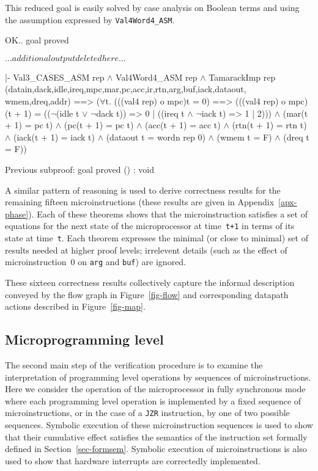 This reduced goal is easily solved by case analysis on Boolean terms
and using the assumption expressed by \verb"Val4Word4_ASM".

\newpage %

\begintt
OK..
goal proved

\( \ldots additional output deleted here \ldots \)

|- Val3_CASES_ASM rep \(\wedge\)
   Val4Word4_ASM rep \(\wedge\)
   TamarackImp 
   rep
   (datain,dack,idle,ireq,mpc,mar,pc,acc,ir,rtn,arg,buf,iack,dataout,
    wmem,dreq,addr) ==>
   (\(\forall\)t.
     (((val4 rep) o mpc)t = 0) ==>
     (((val4 rep) o mpc)(t + 1) =
      ((\(\neg\)(idle t \(\vee\) \(\neg\)dack t)) => 0 | ((ireq t \(\wedge\) \(\neg\)iack t) => 1 | 2))) \(\wedge\)
     (mar(t + 1) = pc t) \(\wedge\)
     (pc(t + 1) = pc t) \(\wedge\)
     (acc(t + 1) = acc t) \(\wedge\)
     (rtn(t + 1) = rtn t) \(\wedge\)
     (iack(t + 1) = iack t) \(\wedge\)
     (dataout t = wordn rep 0) \(\wedge\)
     (wmem t = F) \(\wedge\)
     (dreq t = F))

Previous subproof:
goal proved
() : void
\endtt

A similar pattern of reasoning is used to derive correctness results for the
remaining fifteen microinstructions
(these results are given in Appendix~\ref{apx-phase}).
Each of these theorems shows that the microinstruction
satisfies a set of equations for the next state of the microprocessor
at time~\verb"t+1" in terms of its state at time~\verb"t".
Each theorem expresses the minimal (or close to minimal) set of results
needed at higher proof levels;
irrelevent details (such as the effect of
microinstruction~0 on \verb"arg" and \verb"buf") are ignored.

These sixteen correctness results collectively
capture the informal description conveyed by
the flow graph in Figure~\ref{fig-flow} and corresponding
datapath actions described in Figure~\ref{fig-map}.

\subsection{Microprogramming level}
\label{sec-verfmicro}

The second main step of the verification procedure is
to examine the interpretation of programming level operations
by sequences of microinstructions.
Here we consider the operation of the microprocessor
in fully synchronous mode where each programming level operation
is implemented by a fixed sequence of microinstructions, or in the
case of a \verb"JZR" instruction,
by one of two possible sequences.
Symbolic execution of these microinstruction sequences
is used to show that their cumulative effect
satisfies the semantics of the instruction
set formally defined in Section~\ref{sec-formsem}.
Symbolic execution of microinstructions is also used to show that
hardware interrupts are correctedly implemented.

